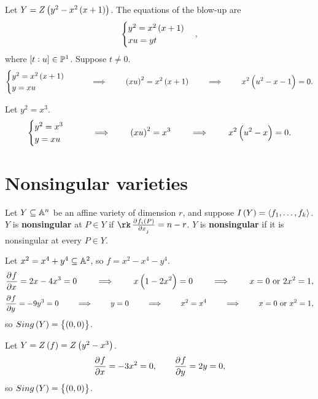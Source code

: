 \begin{example}
Let $ Y = Z\br{y^2 - x^2\br{x + 1}} $. The equations of the blow-up are
$$
\begin{cases}
y^2 = x^2\br{x + 1} \\
xu = yt
\end{cases},
$$
where $ \sbr{t : u} \in \PP^1 $. Suppose $ t \ne 0 $.
$$
\begin{cases}
y^2 = x^2\br{x + 1} \\
y = xu
\end{cases}
\qquad \implies \qquad \br{xu}^2 = x^2\br{x + 1} \qquad \implies \qquad x^2\br{u^2 - x - 1} = 0.
$$
\end{example}

\begin{example}
Let $ y^2 = x^3 $.
$$
\begin{cases}
y^2 = x^3 \\
y = xu
\end{cases}
\qquad \implies \qquad \br{xu}^2 = x^3 \qquad \implies \qquad x^2\br{u^2 - x} = 0.
$$
\end{example}

\pagebreak

\section{Nonsingular varieties}


\begin{definition}
Let $ Y \subseteq \AA^n $ be an affine variety of dimension $ r $, and suppose $ I\br{Y} = \abr{f_1, \dots, f_k} $. $ Y $ is \textbf{nonsingular} at $ P \in Y $ if $ \rk \tpd{f_i\br{P}}{x_j} = n - r $. $ Y $ is \textbf{nonsingular} if it is nonsingular at every $ P \in Y $.
\end{definition}

\begin{example}
Let $ x^2 = x^4 + y^4 \subseteq \AA^2 $, so $ f = x^2 - x^4 - y^4 $.
$$ \dpd{f}{x} = 2x - 4x^3 = 0 \qquad \implies \qquad x\br{1 - 2x^2} = 0 \qquad \implies \qquad x = 0 \ \text{or} \ 2x^2 = 1, $$
$$ \dpd{f}{y} = -9y^3 = 0 \qquad \implies \qquad y = 0 \qquad \implies \qquad x^2 = x^4 \qquad \implies \qquad x = 0 \ \text{or} \ x^2 = 1, $$
so $ Sing\br{Y} = \cbr{\br{0, 0}} $.
\end{example}

\begin{example}
Let $ Y = Z\br{f} = Z\br{y^2 - x^3} $.
$$ \dpd{f}{x} = -3x^2 = 0, \qquad \dpd{f}{y} = 2y = 0, $$
so $ Sing\br{Y} = \cbr{\br{0, 0}} $.
\end{example}

